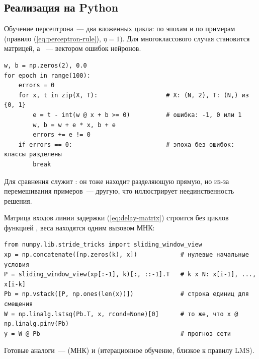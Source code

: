 \subsection{Реализация на Python}
\label{sec:py-perceptron}

Обучение персептрона~--- два вложенных цикла: по эпохам и по примерам (правило (\ref{eq:perceptron-rule}),
$\eta = 1$). Для многоклассового случая  становится матрицей, а ~--- вектором ошибок
нейронов.
\begin{lstlisting}
w, b = np.zeros(2), 0.0
for epoch in range(100):
    errors = 0
    for x, t in zip(X, T):                   # X: (N, 2), T: (N,) из {0, 1}
        e = t - int(w @ x + b >= 0)          # ошибка: -1, 0 или 1
        w, b = w + e * x, b + e
        errors += e != 0
    if errors == 0:                          # эпоха без ошибок: классы разделены
        break
\end{lstlisting}
Для сравнения служит : он тоже находит разделяющую
прямую, но из-за перемешивания примеров~--- другую, что иллюстрирует неединственность решения.

Матрица входов линии задержки (\ref{eq:delay-matrix}) строится без циклов функцией
, веса находятся одним вызовом МНК:
\begin{lstlisting}
from numpy.lib.stride_tricks import sliding_window_view
xp = np.concatenate([np.zeros(k), x])            # нулевые начальные условия
P = sliding_window_view(xp[:-1], k)[:, ::-1].T   # k x N: x[i-1], ..., x[i-k]
Pb = np.vstack([P, np.ones(len(x))])             # строка единиц для смещения
W = np.linalg.lstsq(Pb.T, x, rcond=None)[0]      # то же, что x @ np.linalg.pinv(Pb)
y = W @ Pb                                       # прогноз сети
\end{lstlisting}
Готовые аналоги~---  (МНК) и 
(итерационное обучение, близкое к правилу LMS).
